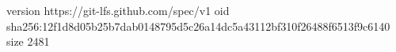 version https://git-lfs.github.com/spec/v1
oid sha256:12f1d8d05b25b7dab0148795d5c26a14dc5a43112bf310f26488f6513f9c6140
size 2481
